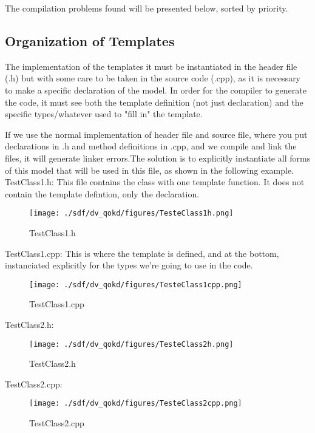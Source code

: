 The compilation problems found will be presented below, sorted by priority.

\subsection{Organization of Templates} 

The implementation of the templates it must be instantiated in the header file (.h) but with some care to be taken in the source code (.cpp), as it is necessary to make a specific declaration of the model.
In order for the compiler to generate the code, it must see both the template definition (not just declaration) and the specific types/whatever used to "fill in" the template.

If we use the normal implementation of header file and source file, where you put declarations in .h and method definitions in .cpp, and we compile and link the files, it will generate linker errors.The solution is to explicitly instantiate all forms of this model that will be used in this file, as shown in the following example.
\newline
TestClass1.h:
This file contains the class with one template function. It does not contain the template defintion, only the declaration. 

\begin{figure}[h]
	\centering\texttt{[image: ./sdf/dv\_qokd/figures/TesteClass1h.png]}
	\caption{TestClass1.h}
	\label{fig:message}
\end{figure}

TestClass1.cpp:
This is where the template is defined, and at the bottom, instanciated explicitly for the types we're going to use in the code.

\begin{figure}[h]
	\centering\texttt{[image: ./sdf/dv\_qokd/figures/TesteClass1cpp.png]}
	\caption{TestClass1.cpp}
	\label{fig:message}
\end{figure}

\vspace{4cm}

TestClass2.h:

\begin{figure}[h]
	\centering\texttt{[image: ./sdf/dv\_qokd/figures/TesteClass2h.png]}
	\caption{TestClass2.h}
	\label{fig:message}
\end{figure}

TestClass2.cpp:

\begin{figure}[h]
	\centering\texttt{[image: ./sdf/dv\_qokd/figures/TesteClass2cpp.png]}
	\caption{TestClass2.cpp}
	\label{fig:message}
\end{figure}

